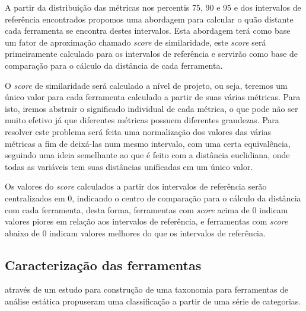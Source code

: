 A partir da distribuição das métricas nos percentis 75, 90 e 95 e dos
intervalos de referência encontrados propomos uma abordagem para calcular o
quão distante cada ferramenta se encontra destes intervalos.  Esta abordagem
terá como base um fator de aproximação chamado {\it score} de similaridade,
este {\it score} será primeiramente calculado para os intervalos de referência
e servirão como base de comparação para o cálculo da distância de cada
ferramenta.

O {\it score} de similaridade será calculado a nível de projeto, ou seja,
teremos um único valor para cada ferramenta calculado a partir de suas várias
métricas. Para isto, iremos abstrair o significado individual de cada métrica,
o que pode não ser muito efetivo já que diferentes métricas possuem diferentes
grandezas. Para resolver este problema será feita uma normalização dos valores
das várias métricas a fim de deixá-las num mesmo intervalo, com uma certa
equivalência, seguindo uma ideia semelhante ao que é feito com a distância
euclidiana, onde todas as variáveis tem suas distâncias unificadas em um único
valor.

Os valores do {\it score} calculados a partir dos intervalos de referência
serão centralizados em 0, indicando o centro de comparação para o cálculo da
distância com cada ferramenta, desta forma, ferramentas com {\it score} acima
de 0 indicam valores piores em relação aos intervalos de referência, e
ferramentas com {\it score} abaixo de 0 indicam valores melhores do que os
intervalos de referência.

\subsection{Caracterização das ferramentas} \label{caracterizacao-das-ferramentas}

 através de um estudo para construção de uma taxonomia
para ferramentas de análise estática propuseram uma classificação a partir de
uma série de categorias.

